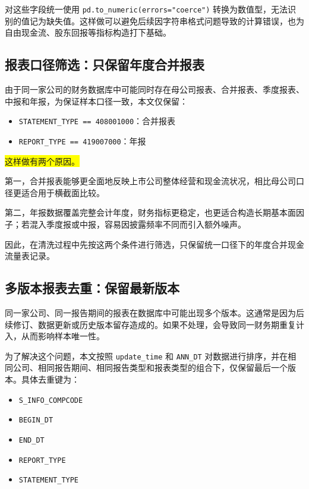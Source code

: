 \documentclass[a4paper,10pt]{article}
\begin{document}
对这些字段统一使用 \texttt{pd.to\_numeric(errors="coerce")} 转换为数值型，无法识别的值记为缺失值。这样做可以避免后续因字符串格式问题导致的计算错误，也为自由现金流、股东回报等指标构造打下基础。


\subsection{报表口径筛选：只保留年度合并报表}

由于同一家公司的财务数据库中可能同时存在母公司报表、合并报表、季度报表、中报和年报，为保证样本口径一致，本文仅保留：

\begin{itemize}
    \item \texttt{STATEMENT\_TYPE == 408001000}：合并报表
    \item \texttt{REPORT\_TYPE == 419007000}：年报
\end{itemize}

\colorbox{yellow}{这样做有两个原因。}

第一，合并报表能够更全面地反映上市公司整体经营和现金流状况，相比母公司口径更适合用于横截面比较。

第二，年报数据覆盖完整会计年度，财务指标更稳定，也更适合构造长期基本面因子；若混入季度报或中报，容易因披露频率不同而引入额外噪声。

因此，在清洗过程中先按这两个条件进行筛选，只保留统一口径下的年度合并现金流量表记录。


\subsection{多版本报表去重：保留最新版本}

同一家公司、同一报告期间的报表在数据库中可能出现多个版本。这通常是因为后续修订、数据更新或历史版本留存造成的。如果不处理，会导致同一财务期重复计入，从而影响样本唯一性。

为了解决这个问题，本文按照 \texttt{update\_time} 和 \texttt{ANN\_DT} 对数据进行排序，并在相同公司、相同报告期间、相同报告类型和报表类型的组合下，仅保留最后一个版本。具体去重键为：

\begin{itemize}
    \item \texttt{S\_INFO\_COMPCODE}
    \item \texttt{BEGIN\_DT}
    \item \texttt{END\_DT}
    \item \texttt{REPORT\_TYPE}
    \item \texttt{STATEMENT\_TYPE}
\end{itemize}
\end{document}
